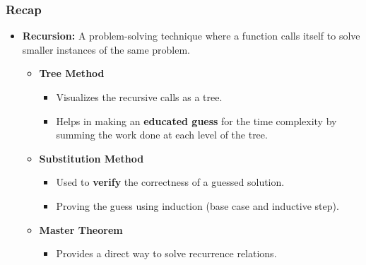 \documentclass[10pt,aspectratio=43]{beamer}
\begin{document}
\begin{frame}
  \frametitle{Recap}
  \begin{itemize}

    \item \textbf{Recursion:} A problem-solving technique where a function calls itself to solve smaller instances of the same problem.
    
    \vspace{5pt}
    \begin{itemize}
        \item \textbf{Tree Method}  
         	\begin{itemize}
		        \item Visualizes the recursive calls as a tree.
		        \vspace{3pt}
		        \item Helps in making an   \textbf{educated guess} for the time complexity by summing the work done at each level of the tree.
    	    \end{itemize}
        \vspace{5pt}



        \item \textbf{Substitution Method} 
        \vspace{3pt}
        	\begin{itemize}
		        \item Used to \textbf{verify} the correctness of a guessed solution.
		        \vspace{3pt}
		        \item Proving the guess using induction (base case and inductive step).
    	    \end{itemize}
	    
	    
	    
        \vspace{5pt}
        \item \textbf{Master Theorem} 
                	\begin{itemize}
       	\item  Provides a direct way to solve recurrence relations.
	    	    \end{itemize}
    \end{itemize}
  \end{itemize}
\end{frame}
\end{document}
